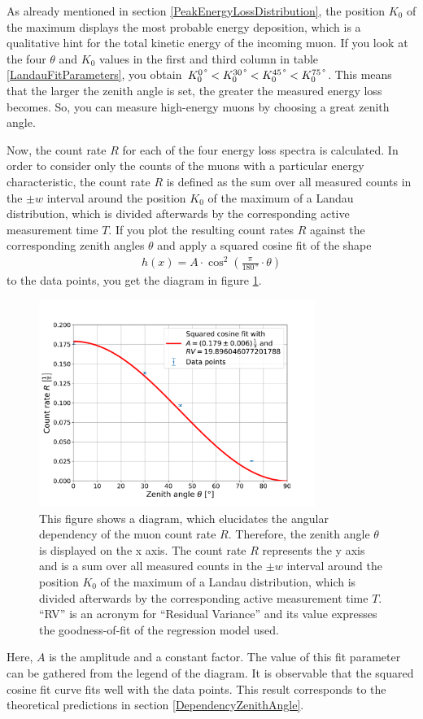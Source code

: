 \noindent As already mentioned in section \ref{PeakEnergyLossDistribution}, the position $K_0$ of the maximum displays the most probable energy deposition, which is a qualitative hint for the total kinetic energy of the incoming muon.
If you look at the four $\theta$ and $K_0$ values in the first and third column in table \ref{LandauFitParameters}, you obtain $K_0^\text{0\,°}<K_0^\text{30\,°}<K_0^\text{45\,°}<K_0^\text{75\,°}$.
This means that the larger the zenith angle is set, the greater the measured energy loss becomes.
So, you can measure high-energy muons by choosing a great zenith angle.

Now, the count rate $R$ for each of the four energy loss spectra is calculated.
In order to consider only the counts of the muons with a particular energy characteristic, the count rate $R$ is defined as the sum over all measured counts in the $\pm w$ interval around the position $K_0$ of the maximum of a Landau distribution, which is divided afterwards by the corresponding active measurement time $T$.
If you plot the resulting count rates $R$ against the corresponding zenith angles $\theta$ and apply a squared cosine fit of the shape
\begin{align} \label{KosinusQuadrat}
h(x)=A\cdot\cos^2\left(\frac{\pi}{180\,\text{°}}\cdot\theta\right)
\end{align}
\noindent to the data points, you get the diagram in figure \ref{AngularDependency}.
\begin{figure}[H]
	\centering
	\includegraphics[width=0.8\textwidth]{src/AngularDependency}
	\caption{This figure shows a diagram, which elucidates the angular dependency of the muon count rate $R$. Therefore, the zenith angle $\theta$ is displayed on the x axis. The count rate $R$ represents the y axis and is a sum over all measured counts in the $\pm w$ interval around the position $K_0$ of the maximum of a Landau distribution, which is divided afterwards by the corresponding active measurement time $T$. \enquote{RV} is an acronym for \enquote{Residual Variance} and its value expresses the goodness-of-fit of the regression model used.}
	\label{AngularDependency}
\end{figure}
\noindent Here, $A$ is the amplitude and a constant factor.
The value of this fit parameter can be gathered from the legend of the diagram.
It is observable that the squared cosine fit curve fits well with the data points.
This result corresponds to the theoretical predictions in section \ref{DependencyZenithAngle}.